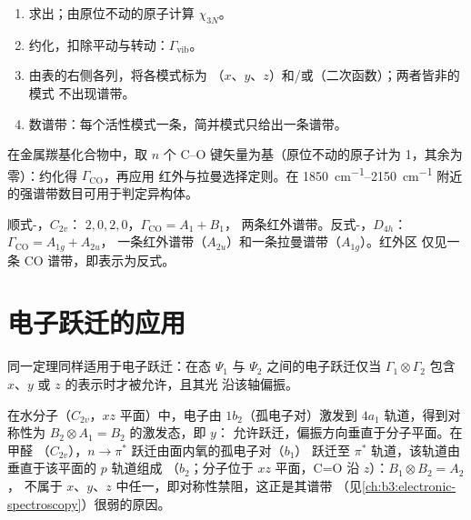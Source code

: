 \begin{method}[预测振动光谱]\label{met:b3:group-theory-applied:vibrations}
\begin{enumerate}
  \item 求出；由原位不动的原子计算 $\chi_{3N}$。
  \item 约化，扣除平动与转动：$\Gamma_{\mathrm{vib}}$。
  \item 由表的右侧各列，将各模式标为
        （$x$、$y$、$z$）和/或（二次函数）；两者皆非的模式
        不出现谱带。
  \item 数谱带：每个活性模式一条，简并模式只给出一条谱带。
\end{enumerate}
\end{method}

\begin{method}[计数 CO 伸缩振动]\label{met:b3:group-theory-applied:co-count}
在金属羰基化合物中，取 $n$ 个 C--O 键矢量为基（原位不动的原子计为
1，其余为零）：约化得 $\Gamma_{\mathrm{CO}}$，再应用
红外与拉曼选择定则。在
\qtyrange{1850}{2150}{cm^{-1}} 附近的强谱带数目可用于判定异构体。
\end{method}

\begin{example}[顺式与反式]\label{ex:b3:group-theory-applied:cis-trans}
顺式-，$C_{2v}$： $2, 0, 2, 0$，$\Gamma_{\mathrm{CO}} = A_1 + B_1$，
两条红外谱带。反式-，$D_{4h}$：$\Gamma_{\mathrm{CO}} = A_{1g} + A_{2u}$，
一条红外谱带（$A_{2u}$）和一条拉曼谱带（$A_{1g}$）。红外区
仅见一条 CO 谱带，即表示为反式。
\end{example}

\section{电子跃迁的应用}

同一定理同样适用于电子跃迁：在态
$\Psi_1$ 与 $\Psi_2$ 之间的电子跃迁仅当 $\Gamma_1\otimes\Gamma_2$
包含 $x$、$y$ 或 $z$ 的表示时才被允许，且其光
沿该轴偏振。

\begin{example}[水与甲醛的跃迁]\label{ex:b3:group-theory-applied:electronic}
在水分子（$C_{2v}$，$xz$ 平面）中，电子由 $1b_2$（孤电子对）激发到
$4a_1$ 轨道，得到对称性为 $B_2\otimes A_1 = B_2$ 的激发态，即 $y$：
允许跃迁，偏振方向垂直于分子平面。在甲醛
（$C_{2v}$），$n\to\pi^*$ 跃迁由面内氧的孤电子对（$b_1$）
跃迁至 $\pi^*$ 轨道，该轨道由垂直于该平面的 $p$ 轨道组成
（$b_2$；分子位于 $xz$ 平面，C=O 沿 $z$）：$B_1\otimes B_2 = A_2$，
不属于 $x$、$y$、$z$ 中任一，即对称性禁阻，这正是其谱带
（见\cref{ch:b3:electronic-spectroscopy}）很弱的原因。
\end{example}

